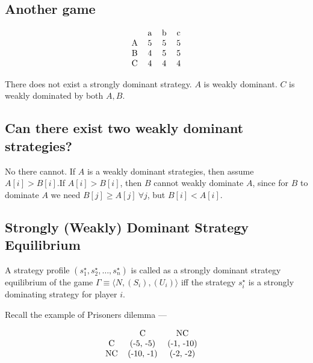 \documentclass[11pt]{book}
\begin{document}
\subsection{Another game}
$$
\begin{tabular}{ccccc}
      & a & b & c \\
    A & 5 & 5 & 5 \\
    B & 4 & 5 & 5\\
    C & 4 & 4 & 4
\end{tabular}
$$

There does not exist a strongly dominant strategy.
$A$ is weakly dominant. $C$ is weakly dominated by both $A, B$.

\subsection{Can there exist two weakly dominant strategies?}
No there cannot. If $A$ is a weakly dominant strategies, then
assume $A[i] > B[i]$.If $A[i] > B[i]$, then $B$ cannot weakly dominate 
$A$, since for $B$ to dominate $A$ we need $B[j] \geq A[j]~ \forall j$,
but $B[i] < A[i]$.


\subsection{Strongly (Weakly) Dominant Strategy Equilibrium}
A strategy profile $(s_1^\star, s_2^\star, \dots, s_n^\star)$ is called as a strongly
dominant strategy equilibrium of the game $\Gamma \equiv \langle N, (S_i), (U_i) \rangle$ iff
the strategy $s_i^\star$ is a strongly dominating strategy for player $i$.

Recall the example of Prisoners dilemma ---

$$
\begin{tabular}{ccccc}
     & C & NC & \\
    C & (-5, -5) & (-1, -10) \\ 
    NC &  (-10, -1) & (-2, -2)
\end{tabular}
$$
\end{document}
